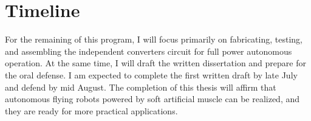 \documentclass[../main.tex]{subfiles}
\begin{document}
\section{Timeline}
\label{sec:timeline}

For the remaining of this program, I will focus primarily on fabricating, testing, and assembling the independent converters circuit for full power autonomous operation. At the same time, I will draft the written dissertation and prepare for the oral defense. I am expected to complete the first written draft by late July and defend by mid August. The completion of this thesis will affirm that autonomous flying robots powered by soft artificial muscle can be realized, and they are ready for more practical applications.
\end{document}
